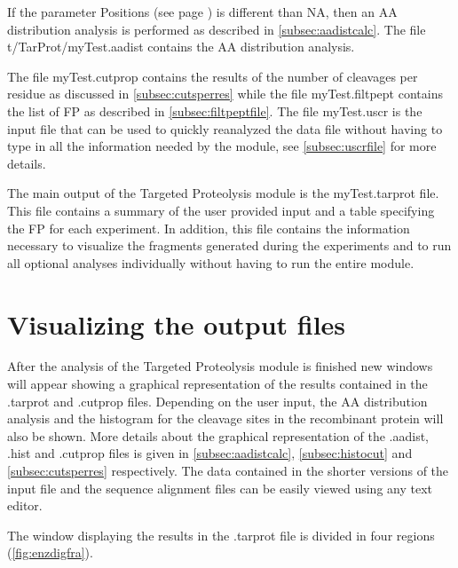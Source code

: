 If the parameter Positions (see page \pageref{par:enzdigPos}) is different than NA, then an AA distribution analysis is performed as described in \autoref{subsec:aadistcalc}. The file t/TarProt/myTest.aadist contains the AA distribution analysis.

The file myTest.cutprop contains the results of the number of cleavages per residue as discussed in \autoref{subsec:cutsperres} while the file myTest.filtpept contains the list of FP as described in \autoref{subsec:filtpeptfile}. The file myTest.uscr is the input file that can be used to quickly reanalyzed the data file without having to type in all the information needed by the module, see \autoref{subsec:uscrfile} for more details. 

The main output of the Targeted Proteolysis module is the myTest.tarprot file. This file contains a summary of the user provided input and a table specifying the FP for each experiment. In addition, this file contains the information necessary to visualize the fragments generated during the experiments and to run all optional analyses individually without having to run the entire module.

\section{Visualizing the output files}

After the analysis of the Targeted Proteolysis module is finished new windows will appear showing a graphical representation of the results contained in the .tarprot and .cutprop files. Depending on the user input, the AA distribution analysis and the histogram for the cleavage sites in the recombinant protein will also be shown. More details about the graphical representation of the .aadist, .hist and .cutprop files is given in \autoref{subsec:aadistcalc}, \autoref{subsec:histocut} and \autoref{subsec:cutsperres} respectively. The data contained in the shorter versions of the input file and the sequence alignment files can be easily viewed using any text editor.   

The window displaying the results in the .tarprot file is divided in four regions (\autoref{fig:enzdigfra}).

